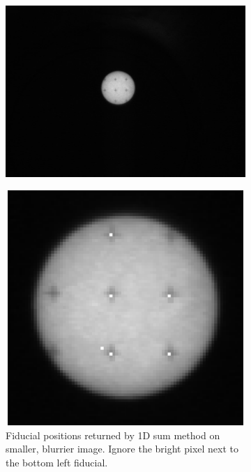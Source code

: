 \documentclass[10pt]{scrartcl}
\begin{document}
\begin{figure}[!ht]
    \begin{subfigure}[b]{.5\linewidth}
        \centering
        \includegraphics[width=\linewidth]{../plots_tables_images/orig_sun.jpg}
        \caption{}
        \label{orig}
    \end{subfigure}
    \begin{subfigure}[b]{.5\linewidth}
        \centering
        \includegraphics[width=\linewidth]{../plots_tables_images/smooth_fid_test.eps}
        \caption{Fiducial positions returned by 1D sum method on smaller, blurrier image. Ignore the bright pixel next to the bottom left fiducial.}
        \label{smoothed_fid_test}
    \end{subfigure}
    \caption{}
\end{figure}
\end{document}
